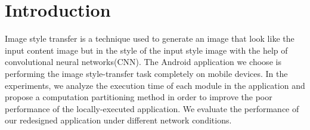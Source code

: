 \documentclass[a4paper,11pt,onecolumn,twoside]{article}
\begin{document}
\begin{CJK*}{GBK}{song}
\begin{center}
{%
}
\end{center}
\setlength{\oddsidemargin}{-.5cm}  %
\setlength{\evensidemargin}{\oddsidemargin}
\setlength{\textwidth}{17.00cm}
\section{Introduction}
Image style transfer\cite{1508.06576} is a technique used to generate an image
that look like the input content image but in the style of the input
style image with the help of convolutional neural networks(CNN).
The Android application we choose is performing the image 
style-transfer task completely on mobile devices. In the experiments,
we analyze the execution time of each module in the application and 
propose a computation partitioning method in order to improve the 
poor performance of the locally-executed application. We evaluate the
performance of our redesigned application under different network 
conditions.


\end{CJK*}
\end{document}
